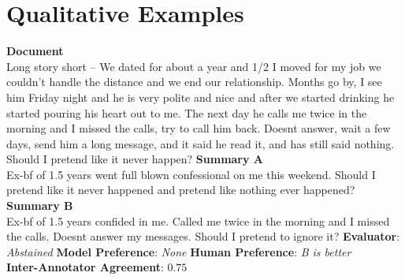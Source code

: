 \section{Qualitative Examples}
\vspace{10pt}
\begin{tcolorbox}[colback=white,colframe=black!75!white,colbacktitle=black!75!white,title=Summarization Example 1]
  \textbf{Document} \\
  Long story short -- We dated for about a year and 1/2 I moved for my job we couldn't handle the distance and we end our relationship. Months go by, I see him Friday night and he is very polite and nice and after we started drinking he started pouring his heart out to me. The next day he calls me twice in the morning and I missed the calls, try to call him back. Doesnt answer, wait a few days, send him a long message, and it said he read it, and has still said nothing. Should I pretend like it never happen?
  \tcbline
  \textbf{Summary A} \\
  Ex-bf of 1.5 years went full blown confessional on me this weekend. Should I pretend like it never happened and pretend like nothing ever happened?
  \tcbline
  \textbf{Summary B} \\
  Ex-bf of 1.5 years confided in me. Called me twice in the morning and I missed the calls. Doesnt answer my messages. Should I pretend to ignore it?
  \tcbline
  \textbf{Evaluator}: \textit{Abstained} \quad \textbf{Model Preference}: \textit{None} \quad \textbf{Human Preference}: \textit{B is better}\\
  \textbf{Inter-Annotator Agreement}: $0.75$
\end{tcolorbox}
\vspace{10pt}
